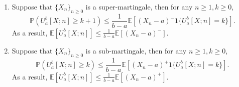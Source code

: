 \begin{theorem}\label{The:upcrossing}
\begin{enumerate}
\item
Suppose that $\{X_n\}_{n\ge0}$ is a super-martingale, then for any $n\ge1, k\ge0$,
\[
\mathbb{P}\left(
U_a^b[X;n]\ge k+1
\right)\le \frac{1}{b-a}\mathbb{E}\left[
(X_n -a)^-1\{U_a^b[X;n]=k\}
\right].
\]
As a result, $\mathbb{E}[U_a^b[X;n]]\le\frac{1}{b-a}\mathbb{E}[(X_n-a)^-]$.
\item
Suppose that $\{X_n\}_{n\ge0}$ is a sub-martingale, then for any $n\ge1, k\ge0$,
\[
\mathbb{P}\left(
U_a^b[X;n]\ge k
\right)\le \frac{1}{b-a}\mathbb{E}\left[
(X_n-a)^+1\{U_a^b[X;n]=k\}
\right].
\]
As a result, $\mathbb{E}[U_a^b[X;n]]\le\frac{1}{b-a}\mathbb{E}[(X_n-a)^+]$.
\end{enumerate}
\end{theorem}

